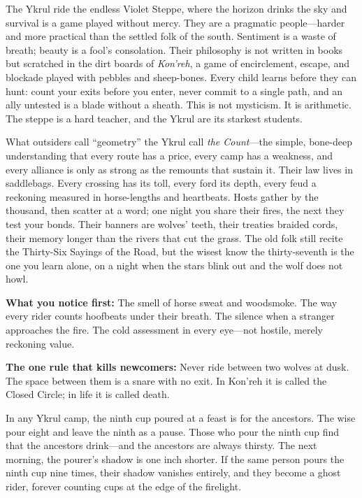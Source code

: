 \vspace{2mm}
\begin{tcolorbox}[colback=black!3,colframe=blue!60!black,title={Theme \& Atmosphere},breakable]
The Ykrul ride the endless Violet Steppe, where the horizon drinks the sky and survival is a game played without mercy. They are a pragmatic people---harder and more practical than the settled folk of the south. Sentiment is a waste of breath; beauty is a fool's consolation. Their philosophy is not written in books but scratched in the dirt boards of \emph{Kon'reh}, a game of encirclement, escape, and blockade played with pebbles and sheep-bones. Every child learns before they can hunt: count your exits before you enter, never commit to a single path, and an ally untested is a blade without a sheath. This is not mysticism. It is arithmetic. The steppe is a hard teacher, and the Ykrul are its starkest students.

What outsiders call ``geometry'' the Ykrul call \emph{the Count}---the simple, bone-deep understanding that every route has a price, every camp has a weakness, and every alliance is only as strong as the remounts that sustain it. Their law lives in saddlebags. Every crossing has its toll, every ford its depth, every feud a reckoning measured in horse-lengths and heartbeats. Hosts gather by the thousand, then scatter at a word; one night you share their fires, the next they test your bonds. Their banners are wolves' teeth, their treaties braided cords, their memory longer than the rivers that cut the grass. The old folk still recite the Thirty-Six Sayings of the Road, but the wisest know the thirty-seventh is the one you learn alone, on a night when the stars blink out and the wolf does not howl.

\vspace{2mm}
\textbf{What you notice first:} The smell of horse sweat and woodsmoke. The way every rider counts hoofbeats under their breath. The silence when a stranger approaches the fire. The cold assessment in every eye---not hostile, merely reckoning value.

\textbf{The one rule that kills newcomers:} Never ride between two wolves at dusk. The space between them is a snare with no exit. In Kon'reh it is called the Closed Circle; in life it is called death.
\end{tcolorbox}

\begin{tcolorbox}[colback=black!3,colframe=red!60!black,title={The Ninth Taboo Manifestation},breakable]
In any Ykrul camp, the ninth cup poured at a feast is for the ancestors. The wise pour eight and leave the ninth as a pause. Those who pour the ninth cup find that the ancestors drink---and the ancestors are always thirsty. The next morning, the pourer's shadow is one inch shorter. If the same person pours the ninth cup nine times, their shadow vanishes entirely, and they become a ghost rider, forever counting cups at the edge of the firelight.
\end{tcolorbox}

